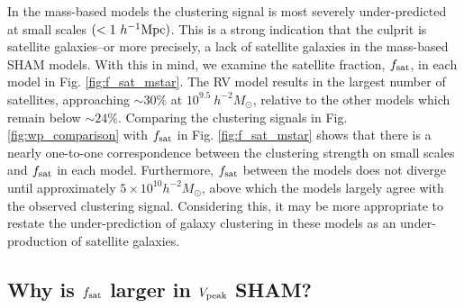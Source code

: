 \documentclass[a4paper,fleqn,usenatbib]{mnras}
\begin{document}
In the mass-based models the clustering signal is most severely under-predicted at small scales $(<1~h^{-1}{\rm Mpc})$.  This is a strong indication that the culprit is satellite galaxies--or more precisely, a lack of satellite galaxies in the mass-based SHAM models.  With this in mind, we examine the satellite fraction, $f_{\rm sat}$, in each model in Fig. \ref{fig:f_sat_mstar}.  The RV model results in the largest number of satellites, approaching $\sim30\%$ at $10^{9.5}~h^{-2}M_{\odot}$, relative to the other models which remain below  $\sim24\%$.  Comparing the clustering signals in Fig. \ref{fig:wp_comparison} with $f_{\rm sat}$ in Fig. \ref{fig:f_sat_mstar} shows that there is a nearly one-to-one correspondence between the clustering strength on small scales and $f_{\rm sat}$ in each model.  Furthermore, $f_{\rm sat}$ between the models does not diverge until approximately $5 \times 10^{10}h^{-2}M_{\odot}$, above which the models largely agree with the observed clustering signal.  Considering this, it may be more appropriate to restate the under-prediction of galaxy clustering in these models as an under-production of satellite galaxies.


\subsection{Why is $f_{\rm sat}$ larger in $V_{\rm peak}$ SHAM?}
\end{document}
